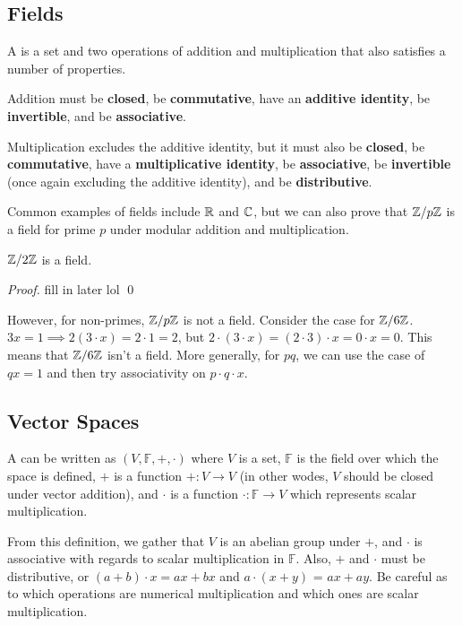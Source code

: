 \documentclass{book}
\begin{document}
\subsection{Fields}
\begin{definition}[Field]
	A  is a set and two operations of addition and multiplication that also satisfies a number of properties.

	Addition must be \textbf{closed}, be \textbf{commutative}, have an \textbf{additive identity}, be \textbf{invertible}, and be \textbf{associative}.

	Multiplication excludes the additive identity, but it must also be \textbf{closed}, be \textbf{commutative}, have a \textbf{multiplicative identity}, be \textbf{associative}, be \textbf{invertible} (once again excluding the additive identity), and be \textbf{distributive}. 
\end{definition}

Common examples of fields include $\mathbb{R}$ and $\mathbb{C}$, but we can also prove that $\mathbb{Z} / p\mathbb{Z}$ is a field for prime $p$ under modular addition and multiplication.

\begin{lemma}
	$\mathbb{Z} / 2\mathbb{Z}$ is a field.
\end{lemma}
\textit{Proof.} fill in later lol \qed

However, for non-primes, $\mathbb{Z} / p\mathbb{Z}$ is not a field. Consider the case for $\mathbb{Z} / 6\mathbb{Z}$. $3x = 1 \implies 2 (3 \cdot x) = 2 \cdot 1 = 2$, but $2 \cdot (3 \cdot x) = (2 \cdot 3) \cdot x = 0 \cdot x = 0$. This means that $\mathbb{Z} / 6\mathbb{Z}$ isn't a field. More generally, for $pq$, we can use the case of $qx = 1$ and then try associativity on $p \cdot q \cdot x$. 
\subsection{Vector Spaces}
\begin{definition}
	A  can be written as $(V, \mathbb{F}, +, \cdot)$ where $V$ is a set, $\mathbb{F}$ is the field over which the space is defined, $+$ is a function $+ : V \to V$ (in other wodes, $V$ should be closed under vector addition), and $\cdot$ is a function $\cdot : \mathbb{F} \to V$ which represents scalar multiplication.
\end{definition}

From this definition, we gather that $V$ is an abelian group under $+$, and $\cdot$ is associative with regards to scalar multiplication in $\mathbb{F}$. Also, $+$ and $\cdot$ must be distributive, or $(a + b) \cdot x = ax + bx$ and $a \cdot (x + y)$ = $ax + ay$. Be careful as to which operations are numerical multiplication and which ones are scalar multiplication.
\end{document}
